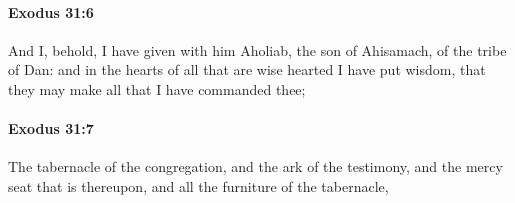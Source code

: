 		\paragraph{Exodus 31:6} %
			\label{EXODUS-31-6}

			And I, behold, I have given with him Aholiab, the son of Ahisamach, of the tribe of Dan: and in the hearts of all that are wise hearted I have put wisdom, that they may make all that I have commanded thee;


		\paragraph{Exodus 31:7} %
			\label{EXODUS-31-7}

			The tabernacle of the congregation, and the ark of the testimony, and the mercy seat that is thereupon, and all the furniture of the tabernacle,


